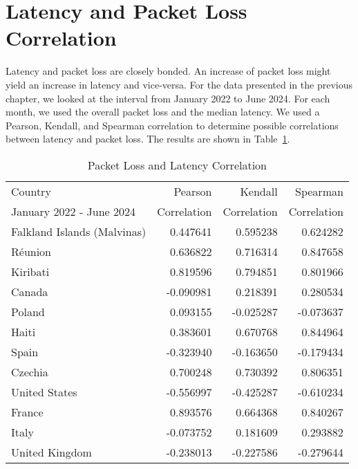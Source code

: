 \section{Latency and Packet Loss Correlation} \label{sec:latency-packetloss-correlation}

Latency and packet loss are closely bonded. An increase of packet loss might yield an increase in latency and vice-versa.
For the data presented in the previous chapter, we looked at the interval from January 2022 to June 2024.
For each month, we used the overall packet loss and the median latency.
We used a Pearson, Kendall, and Spearman correlation to determine possible correlations between latency and packet loss.
The results are shown in Table~\ref{fig:packetloss-latency-correlation}.

\begin{table}[ht]
	\footnotesize
	\caption{Packet Loss and Latency Correlation}
	\label{fig:packetloss-latency-correlation}
	\begin{tabular}{lrrr}
		\toprule
		Country                     & Pearson     & Kendall     & Spearman    \\
		January 2022 - June 2024    & Correlation & Correlation & Correlation \\
		\midrule
		Falkland Islands (Malvinas) & 0.447641    & 0.595238    & 0.624282    \\
		Réunion                     & 0.636822    & 0.716314    & 0.847658    \\
		Kiribati                    & 0.819596    & 0.794851    & 0.801966    \\
		Canada                      & -0.090981   & 0.218391    & 0.280534    \\
		Poland                      & 0.093155    & -0.025287   & -0.073637   \\
		Haiti                       & 0.383601    & 0.670768    & 0.844964    \\
		Spain                       & -0.323940   & -0.163650   & -0.179434   \\
		Czechia                     & 0.700248    & 0.730392    & 0.806351    \\
		United States               & -0.556997   & -0.425287   & -0.610234   \\
		France                      & 0.893576    & 0.664368    & 0.840267    \\
		Italy                       & -0.073752   & 0.181609    & 0.293882    \\
		United Kingdom              & -0.238013   & -0.227586   & -0.279644   \\

\end{tabular}
\end{table}
